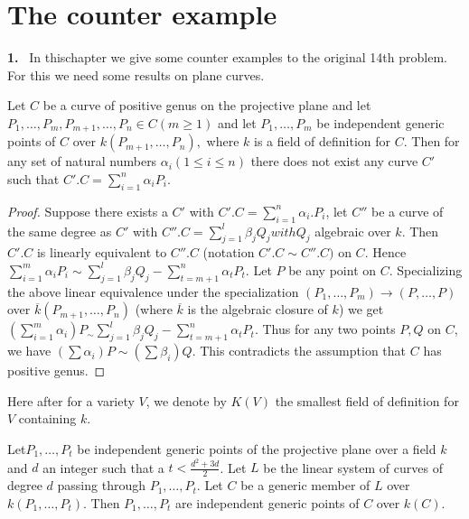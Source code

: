 \chapter{The counter example}%

\textbf{1.}~ In this\pageoriginale chapter we give some counter
examples to the original 14th problem. For this we need some results
on plane curves.  

\setcounter{lem}{0}
\begin{lem}\label{chap3:sec1:lem1}%
 Let $C$ be a curve of positive genus on the projective plane and let
 $P_1, \ldots , P_m, P_{m+1}, \ldots , P_n \in C(m \geq 1) $ and
 let $P_1, \ldots , P_m $ be independent generic points of $C$ over
 $k(P_{m+1}, \ldots , P_n), $ where $k$ is a field of definition
 for $C$. Then for any set of natural numbers $\alpha_{i} (1 \leq i
 \leq n)$ there does not exist any curve $C'$ such that $C'. C =
 \sum\limits^n_{i=1} \alpha _{i} P_{i}$. 
\end{lem}

\begin{proof}
 Suppose there exists a $C'$ with $C'. C =  \sum\limits_{i=1}^n
 \alpha _{i}. P_{i}$, let $C''$ be a curve of the same degree as
 $C'$ with $C''. C = \sum\limits_{j=1}^l \beta_{j} Q_{j} with Q_{j}$ 
algebraic over $k$. Then $C'. C$ is linearly equivalent to
 $C''. C$ (notation $C' . C \sim  C'' .C)$ on $C$. Hence $
 \sum\limits_{i=1}^m \alpha_{i} P_{i} \sim \sum\limits_{j=1}^l
 \beta_{j} Q_{j} -\sum\limits_{t=m+1}^n \alpha _{t} P_{t}. $ Let $P$
 be any point on $C$. Specializing the above linear equivalence under
 the specialization $(P_1, \ldots , P_m) \rightarrow (P, \ldots ,
 P) $ over $\overline{k} (P_{m+1}, \ldots , P_n)$ (where 
$\overline{k} $ is the algebraic closure of $k$) we get 
$(\sum\limits_{i=1}^m \alpha _{i}) P_\sim \sum\limits_{j=1}^l
 \beta_{j}Q_{j} -\sum\limits_{t=m+1}^n \alpha _{t} P_{t}$. Thus for
 any two points $P,Q$ on $C$, we have $ (\sum \alpha _{i}) P \sim
 (\sum \beta_{i}) Q$. This contradicts the assumption that $C$ has
 positive genus. 
\end{proof}

Here after for a variety $V$, we denote by $K(V)$ the smallest field
of definition for $V$ containing $k$.  

\begin{lem}\label{chap3:sec1:lem2}%
 Let\pageoriginale $P_1, \ldots, P_t $ be independent generic points
 of the 
 projective plane over a field $k$ and $d$ an integer such that a 
$t < \frac{d^{2}+3d}{2}$. Let $L$ be the linear system of curves
 of degree $d$ passing through $P_{1}, \ldots ,P_{t}$. Let $C$
 be a generic member of $L$ over $k  (P_1, \ldots , P_t)$. Then 
$P_1, \ldots , P_t $ are independent generic points of $C$ over
 $k(C)$. 
\end{lem}

